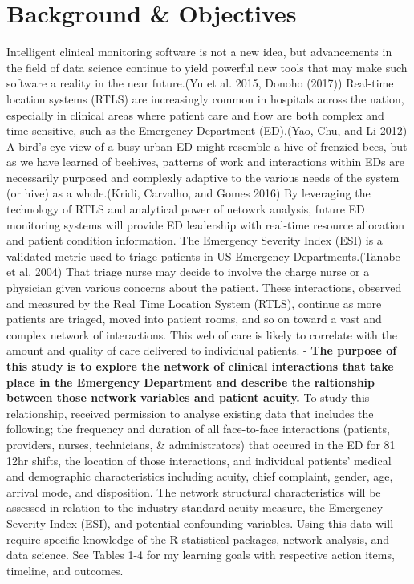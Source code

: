 \documentclass[]{elsarticle} %
\begin{document}
\section{Background \& Objectives}\label{background-objectives}

Intelligent clinical monitoring software is not a new idea, but
advancements in the field of data science continue to yield powerful new
tools that may make such software a reality in the near future.(Yu et
al. 2015, Donoho (2017)) Real-time location systems (RTLS) are
increasingly common in hospitals across the nation, especially in
clinical areas where patient care and flow are both complex and
time-sensitive, such as the Emergency Department (ED).(Yao, Chu, and Li
2012) A bird's-eye view of a busy urban ED might resemble a hive of
frenzied bees, but as we have learned of beehives, patterns of work and
interactions within EDs are necessarily purposed and complexly adaptive
to the various needs of the system (or hive) as a whole.(Kridi,
Carvalho, and Gomes 2016) By leveraging the technology of RTLS and
analytical power of netowrk analysis, future ED monitoring systems will
provide ED leadership with real-time resource allocation and patient
condition information. The Emergency Severity Index (ESI) is a validated
metric used to triage patients in US Emergency Departments.(Tanabe et
al. 2004) That triage nurse may decide to involve the charge nurse or a
physician given various concerns about the patient. These interactions,
observed and measured by the Real Time Location System (RTLS), continue
as more patients are triaged, moved into patient rooms, and so on toward
a vast and complex network of interactions. This web of care is likely
to correlate with the amount and quality of care delivered to individual
patients. - \textbf{The purpose of this study is to explore the network
of clinical interactions that take place in the Emergency Department and
describe the raltionship between those network variables and patient
acuity.} To study this relationship, received permission to analyse
existing data that includes the following; the frequency and duration of
all face-to-face interactions (patients, providers, nurses, technicians,
\& administrators) that occured in the ED for 81 12hr shifts, the
location of those interactions, and individual patients' medical and
demographic characteristics including acuity, chief complaint, gender,
age, arrival mode, and disposition. The network structural
characteristics will be assessed in relation to the industry standard
acuity measure, the Emergency Severity Index (ESI), and potential
confounding variables. Using this data will require specific knowledge
of the R statistical packages, network analysis, and data science. See
Tables 1-4 for my learning goals with respective action items, timeline,
and outcomes.
\end{document}
